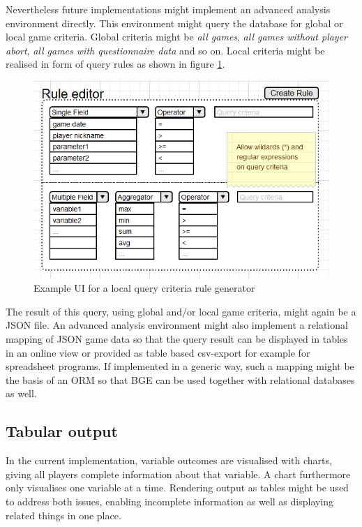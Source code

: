 Nevertheless future implementations might implement an advanced analysis environment directly. This environment might query the database for global or local game criteria. Global criteria might be \textit{all games},  \textit{all games without player abort}, \textit{all games with questionnaire data} and so on. Local criteria might be realised in form of query rules as shown in figure \ref{fig:analysis}.

\begin{figure}
	\centering
	\includegraphics[scale=0.65]{figures/analysis.png}
	\caption{Example UI for a local query criteria rule generator}
	\label{fig:analysis}
\end{figure}

The result of this query, using global and/or local game criteria, might again be a JSON file. An advanced analysis environment might also implement a relational mapping of JSON game data so that the query result can be displayed in tables in an online view or provided as table based csv-export for example for spreadsheet programs. If implemented in a generic way, such a mapping might be the basis of an ORM so that BGE can be used together with relational databases as well.

\subsection{Tabular output}
\label{sub:conclusion:table}

In the current implementation, variable outcomes are visualised with charts, giving all players complete information about that variable. A chart furthermore only visualises one variable at a time. Rendering output as tables might be used to address both issues, enabling incomplete information as well as displaying related things in one place. 

